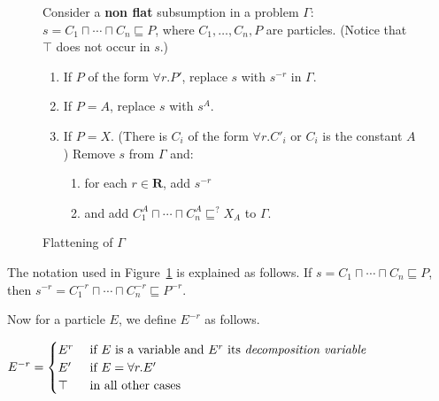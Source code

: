 \documentclass{article}
\newcommand{\barbara}[1]{\todo[inline, color=blue!40]{#1}}
\newcommand{\roles}{\ensuremath{\mathbf{R}}\xspace}
\begin{document}
	\begin{figure}
\begin{framed}
			Consider a \textbf{non flat} subsumption in a problem $\Gamma$: $s=C_1 \sqcap \cdots \sqcap C_n \sqsubseteq P$, where $C_1, \dots, C_n, P$ are particles.
			(Notice that $\top$ does not occur in $s$.)
			\begin{enumerate}
				\item\label{rule:-r} If $P$  of the form $\forall r.P'$,
				replace $s$ with $s^{-r}$ in $\Gamma$.
			
				
				\item\label{rule:A} If $P = A$, replace $s$ with $s^A$.
				
				\item\label{rule:fulldecomposition} If $P = X$. (There is $C_i$ of the form $\forall r.C'_i$ or $C_i$ is the constant $A$)
			Remove $s$ from $\Gamma$ and:
					\begin{enumerate}
						\item\label{rule-s-r} for each $r \in \roles$, add $s^{-r}$
						\item\label{rule:constantdecomposition} and add $C_1^{A} \sqcap \cdots \sqcap C_n^{A} \sqsubseteq^? X_A$ to $\Gamma$.
					\end{enumerate}	
			\end{enumerate}						
\end{framed}
\caption{Flattening of $\Gamma$}	
\label{figure:flattening}
\end{figure}


The notation used in Figure~\ref{figure:flattening} is explained as follows.
If $s = C_1 \sqcap \cdots \sqcap C_n \sqsubseteq P$, then $s^{-r} = C_1^{-r} \sqcap \cdots \sqcap C_n^{-r} \sqsubseteq P^{-r}$.

Now for a particle $E$, we define $E^{-r}$ as follows.

	$
E^{-r} = \begin{cases}
	E^{r} & \text{ if } E \text{ is a variable and }
	 E^r \text{ its \emph{decomposition variable} }\\
	E' & \text{ if } E = \forall r.E' \\
	\top & \text{ in all other cases } 
\end{cases}
$
\end{document}
